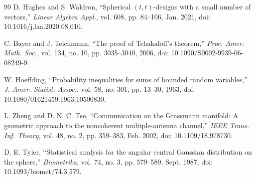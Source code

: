 \documentclass[lettersize,onecolumn]{IEEEtran}
\theoremstyle{remark}
\theoremstyle{definition}
\begin{document}
\begin{thebibliography}{99}
D. Hughes and S. Waldron, ``Spherical $(t,t)$-designs with a small number of vectors,'' \emph{Linear Algebra Appl.}, vol. 608, pp. 84--106, Jan. 2021, doi: 10.1016/j.laa.2020.08.010.

C. Bayer and J. Teichmann, ``The proof of Tchakaloff's theorem,'' \emph{Proc. Amer. Math. Soc.}, vol. 134, no. 10, pp. 3035--3040, 2006, doi: 10.1090/S0002-9939-06-08249-9.

W. Hoeffding, ``Probability inequalities for sums of bounded random variables,'' \emph{J. Amer. Statist. Assoc.}, vol. 58, no. 301, pp. 13--30, 1963, doi: 10.1080/01621459.1963.10500830.

L. Zheng and D. N. C. Tse, ``Communication on the Grassmann manifold: A geometric approach to the noncoherent multiple-antenna channel,'' \emph{IEEE Trans. Inf. Theory}, vol. 48, no. 2, pp. 359--383, Feb. 2002, doi: 10.1109/18.978730.

D. E. Tyler, ``Statistical analysis for the angular central Gaussian distribution on the sphere,'' \emph{Biometrika}, vol. 74, no. 3, pp. 579--589, Sept. 1987, doi: 10.1093/biomet/74.3.579.

\end{thebibliography}
\end{document}
